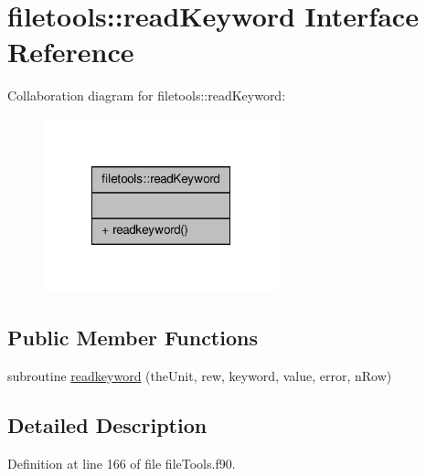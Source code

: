 \hypertarget{interfacefiletools_1_1read_keyword}{\section{filetools\-:\-:read\-Keyword Interface Reference}
\label{interfacefiletools_1_1read_keyword}
}


Collaboration diagram for filetools\-:\-:read\-Keyword\-:\nopagebreak
\begin{figure}[H]
\begin{center}
\leavevmode
\includegraphics[width=192pt]{interfacefiletools_1_1read_keyword__coll__graph}
\end{center}
\end{figure}
\subsection*{Public Member Functions}
\begin{DoxyCompactItemize}
\item 
subroutine \hyperlink{interfacefiletools_1_1read_keyword_a40ca3283fc0c58b6f9ab7d2d921b6f5a}{readkeyword} (the\-Unit, rew, keyword, value, error, n\-Row)
\end{DoxyCompactItemize}


\subsection{Detailed Description}


Definition at line 166 of file file\-Tools.\-f90.



